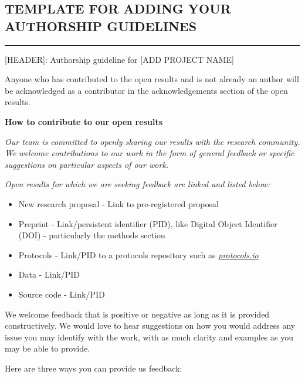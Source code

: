 \documentclass[
  letterpaper,
  DIV=11,
  numbers=noendperiod]{scrreport}
\providecommand{\tightlist}{%
  \setlength{\itemsep}{0pt}\setlength{\parskip}{0pt}}\usepackage{longtable,booktabs,array}
\begin{document}
\hypertarget{template-for-adding-your-authorship-guidelines}{%
\subsection{TEMPLATE FOR ADDING YOUR AUTHORSHIP
GUIDELINES}\label{template-for-adding-your-authorship-guidelines}}

\begin{center}\rule{0.5\linewidth}{0.5pt}\end{center}

{[}HEADER{]}: Authorship guideline for {[}ADD PROJECT NAME{]}

Anyone who has contributed to the open results and is not already an
author will be acknowledged as a contributor in the acknowledgements
section of the open results.

\textbf{How to contribute to our open results}

\emph{Our team is committed to openly sharing our results with the
research community. We welcome contributions to our work in the form of
general feedback or specific suggestions on particular aspects of our
work.}

\emph{Open results for which we are seeking feedback are linked and
listed below:}

\begin{itemize}
\tightlist
\item
  New research proposal - Link to pre-registered proposal
\item
  Preprint - Link/persistent identifier (PID), like Digital Object
  Identifier (DOI) - particularly the methods section
\item
  Protocols - Link/PID to a protocols repository such as
  \href{https://protocols.io/}{\emph{protocols.io}}
\item
  Data - Link/PID
\item
  Source code - Link/PID
\end{itemize}

We welcome feedback that is positive or negative as long as it is
provided constructively. We would love to hear suggestions on how you
would address any issue you may identify with the work, with as much
clarity and examples as you may be able to provide.

Here are three ways you can provide us feedback:
\end{document}
